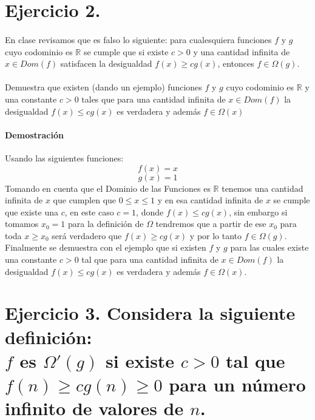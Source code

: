 \documentclass[12pt]{article}
\begin{document}
\section{Ejercicio 2.}
\paragraph{}En clase revisamos que es falso lo siguiente: para cualesquiera funciones $f$ y $g$ cuyo codominio es $\mathbb{R}$ se cumple que si existe $c>0$ y una cantidad infinita de $x\in Dom(f)$ satisfacen la desigualdad $f(x) \geq cg(x)$, entonces $f\in \Omega(g)$.\\\\
Demuestra que existen (dando un ejemplo) funciones $f$ y $g$ cuyo codominio es $\mathbb{R}$ y una constante $c>0$ tales que para una cantidad infinita de $x\in Dom(f)$ la desigualdad  $f(x) \leq cg(x)$ es verdadera y además $f\in\Omega(x)$

\paragraph{Demostración} Usando las siguientes funciones:
\begin{equation}\label{f_ej2}
f(x) = x
\end{equation}
\begin{equation}\label{g_ej2}
g(x) = 1
\end{equation}
Tomando en cuenta que el Dominio de las Funciones es $\mathbb{R}$ tenemos una cantidad infinita de $x$ que cumplen que $0\leq x \leq 1$ y en esa cantidad infinita de $x$ se cumple que existe una $c$, en este caso $c=1$, donde $f(x)\leq cg(x)$, sin embargo si tomamos $x_{0}=1$ para la definición de $\Omega$ tendremos que a partir de ese $x_{0}$ para toda $x \geq x_{0}$ será verdadero que 
$f(x)\geq cg(x)$ y por lo tanto $f\in\Omega(g)$.\\ Finalmente se demuestra con el ejemplo que si existen $f$ y $g$ para las cuales existe una constante $c>0$ tal que para una cantidad infinita de $x\in Dom(f)$ la desigualdad  $f(x) \leq cg(x)$ es verdadera y además $f\in\Omega(x)$.
\pagebreak
\section{Ejercicio 3. Considera la siguiente definición: \\$f$ es $\Omega'(g)$ si existe $c>0$ tal que \\$f(n)\geq cg(n)\geq 0$ para un número infinito de valores de $n$.}
\end{document}
